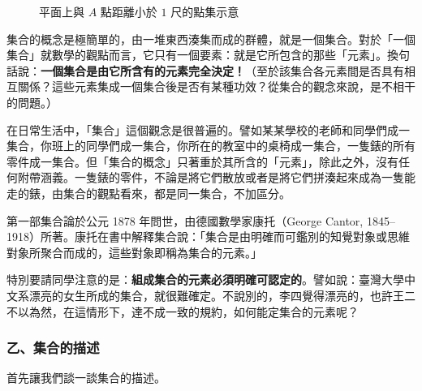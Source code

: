 \begin{figure}[htbp]
\centering
{}
\caption{平面上與 $A$ 點距離小於 $1$ 尺的點集示意}\label{fig:circle_interior_set}
\end{figure}

集合的概念是極簡單的，由一堆東西湊集而成的群體，就是一個集合。對於「一個集合」就數學的觀點而言，它只有一個要素：就是它所包含的那些「元素」。換句話說：\textbf{一個集合是由它所含有的元素完全決定！}（至於該集合各元素間是否具有相互關係？這些元素集成一個集合後是否有某種功效？從集合的觀念來說，是不相干的問題。）

在日常生活中，「集合」這個觀念是很普遍的。譬如某某學校的老師和同學們成一集合，你班上的同學們成一集合，你所在的教室中的桌椅成一集合，一隻錶的所有零件成一集合。但「集合的概念」只著重於其所含的「元素」，除此之外，沒有任何附帶涵義。一隻錶的零件，不論是將它們散放或者是將它們拼湊起來成為一隻能走的錶，由集合的觀點看來，都是同一集合，不加區分。

第一部集合論於公元 1878 年問世，由德國數學家康托（George Cantor, 1845--1918）所著。康托在書中解釋集合說：「集合是由明確而可鑑別的知覺對象或思維對象所聚合而成的，這些對象即稱為集合的元素。」

特別要請同學注意的是：\textbf{組成集合的元素必須明確可認定的}。譬如說：臺灣大學中文系漂亮的女生所成的集合，就很難確定。不說別的，李四覺得漂亮的，也許王二不以為然，在這情形下，達不成一致的規約，如何能定集合的元素呢？

\subsubsection*{乙、集合的描述}\label{subsec:2-3-b}

首先讓我們談一談集合的描述。

